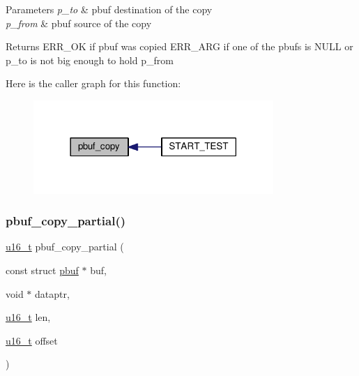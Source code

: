 \begin{DoxyParams}{Parameters}
{\em p\+\_\+to} & pbuf destination of the copy \\
\hline
{\em p\+\_\+from} & pbuf source of the copy\\
\hline
\end{DoxyParams}
\begin{DoxyReturn}{Returns}
E\+R\+R\+\_\+\+OK if pbuf was copied E\+R\+R\+\_\+\+A\+RG if one of the pbufs is N\+U\+LL or p\+\_\+to is not big enough to hold p\+\_\+from 
\end{DoxyReturn}
Here is the caller graph for this function\+:
\nopagebreak
\begin{figure}[H]
\begin{center}
\leavevmode
\includegraphics[width=258pt]{group__pbuf_gaba88511dee3df4b631fde691f421320d_icgraph}
\end{center}
\end{figure}
\mbox{\label{group__pbuf_gac2f1f58fd36042e82af46f5015720899}} 
\subsubsection{\texorpdfstring{pbuf\+\_\+copy\+\_\+partial()}{pbuf\_copy\_partial()}}
{\footnotesize\ttfamily \hyperlink{group__compiler__abstraction_ga77570ac4fcab86864fa1916e55676da2}{u16\+\_\+t} pbuf\+\_\+copy\+\_\+partial (\begin{DoxyParamCaption}\item[{const struct \hyperlink{structpbuf}{pbuf} $\ast$}]{buf,  }\item[{void $\ast$}]{dataptr,  }\item[{\hyperlink{group__compiler__abstraction_ga77570ac4fcab86864fa1916e55676da2}{u16\+\_\+t}}]{len,  }\item[{\hyperlink{group__compiler__abstraction_ga77570ac4fcab86864fa1916e55676da2}{u16\+\_\+t}}]{offset }\end{DoxyParamCaption})}

